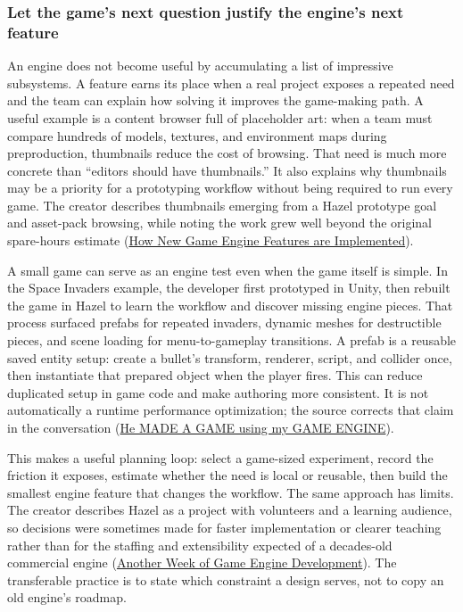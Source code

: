 \subsubsection{Let the game's next question justify the engine's next feature}\label{06-engine-ii-ch041-let-the-games-next-question-justify-the-engines-next-feature}

An engine does not become useful by accumulating a list of impressive subsystems. A feature earns its place when a real project exposes a repeated need and the team can explain how solving it improves the game-making path. A useful example is a content browser full of placeholder art: when a team must compare hundreds of models, textures, and environment maps during preproduction, thumbnails reduce the cost of browsing. That need is much more concrete than ``editors should have thumbnails.'' It also explains why thumbnails may be a priority for a prototyping workflow without being required to run every game. The creator describes thumbnails emerging from a Hazel prototype goal and asset-pack browsing, while noting the work grew well beyond the original spare-hours estimate (\href{https://www.youtube.com/watch?v=z1O6AZWuWm4&t=8m54s}{How New Game Engine Features are Implemented}).

A small game can serve as an engine test even when the game itself is simple. In the Space Invaders example, the developer first prototyped in Unity, then rebuilt the game in Hazel to learn the workflow and discover missing engine pieces. That process surfaced prefabs for repeated invaders, dynamic meshes for destructible pieces, and scene loading for menu-to-gameplay transitions. A prefab is a reusable saved entity setup: create a bullet's transform, renderer, script, and collider once, then instantiate that prepared object when the player fires. This can reduce duplicated setup in game code and make authoring more consistent. It is not automatically a runtime performance optimization; the source corrects that claim in the conversation (\href{https://www.youtube.com/watch?v=56ISmbJE9S4&t=2m10s}{He MADE A GAME using my GAME ENGINE}).

This makes a useful planning loop: select a game-sized experiment, record the friction it exposes, estimate whether the need is local or reusable, then build the smallest engine feature that changes the workflow. The same approach has limits. The creator describes Hazel as a project with volunteers and a learning audience, so decisions were sometimes made for faster implementation or clearer teaching rather than for the staffing and extensibility expected of a decades-old commercial engine (\href{https://www.youtube.com/watch?v=Dr6ly-PO9nM&t=1m45s}{Another Week of Game Engine Development}). The transferable practice is to state which constraint a design serves, not to copy an old engine's roadmap.

